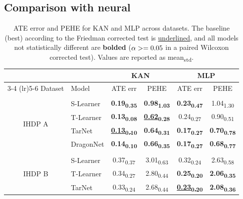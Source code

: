 \subsection{Comparison with neural }

\begin{table}
\vspace{-40pt} %

\caption{ATE error and PEHE for KAN and MLP across datasets. The baseline (best) according to the Friedman corrected test is \underline{underlined}, and all models not statistically different are \textbf{bolded} ($\alpha>=0.05$ in a paired Wilcoxon corrected test). Values are reported as mean\textsubscript{std}.}

\label{tab:kan_vs_mlp_full}
\centering
\scriptsize
\setlength{\tabcolsep}{4pt}
\begin{tabular}{c l cc cc}
& & \multicolumn{2}{c}{KAN} & \multicolumn{2}{c}{MLP} \\
\cmidrule(lr){3-4} \cmidrule(lr){5-6}
Dataset & Model &  ATE err & PEHE & ATE err & PEHE \\
 \hline \\[-1.5ex]
\multirow{4}{*}{IHDP A}
& S-Learner  & \textbf{0.19\textsubscript{0.35}} & \textbf{0.98\textsubscript{1.03}} & \textbf{0.23\textsubscript{0.47}} & 1.04\textsubscript{1.30} \\
& T-Learner  & \textbf{0.13\textsubscript{0.08}} & \underline{\textbf{0.62\textsubscript{0.28}}} & 0.24\textsubscript{0.27} & 0.90\textsubscript{0.51} \\
& TarNet     & \underline{\textbf{0.13\textsubscript{0.10}}} & \textbf{0.64\textsubscript{0.31}} & \textbf{0.17\textsubscript{0.27}} & \textbf{0.70\textsubscript{0.78}} \\
& DragonNet  & \textbf{0.14\textsubscript{0.10}} & \textbf{0.66\textsubscript{0.35}} & \textbf{0.17\textsubscript{0.27}} & \textbf{0.68\textsubscript{0.77}} \\
 \hline \\[-1.5ex]
\multirow{4}{*}{IHDP B}
& S-Learner  & 0.37\textsubscript{0.37} & 3.01\textsubscript{0.63} & 0.32\textsubscript{0.24} & 2.63\textsubscript{0.58} \\
& T-Learner  & 0.34\textsubscript{0.27} & 2.80\textsubscript{0.44} & \textbf{0.25\textsubscript{0.20}} & \textbf{2.06\textsubscript{0.35}} \\
& TarNet     & 0.33\textsubscript{0.24} & 2.68\textsubscript{0.44} & \underline{\textbf{0.23\textsubscript{0.20}}} & \textbf{2.08\textsubscript{0.36}} \\

\end{tabular}
\end{table}
